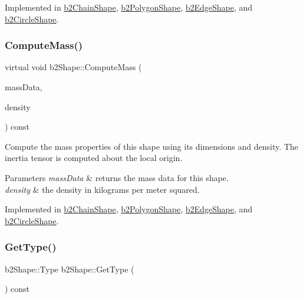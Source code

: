 Implemented in \mbox{\hyperlink{classb2ChainShape_ae1d7470ce8d32e92d27c149ab45f5468}{b2\+Chain\+Shape}}, \mbox{\hyperlink{classb2PolygonShape_ae9bcc185caf4a030003cefc4576e4717}{b2\+Polygon\+Shape}}, \mbox{\hyperlink{classb2EdgeShape_a238139ae1736b457d77443133ff16854}{b2\+Edge\+Shape}}, and \mbox{\hyperlink{classb2CircleShape_af4a4ea78780af7a7ce40bf5d54affe83}{b2\+Circle\+Shape}}.

\mbox{\label{classb2Shape_a61b365526241b47f124789b0309cac69}} 
\subsubsection{\texorpdfstring{Compute\+Mass()}{ComputeMass()}}
{\footnotesize\ttfamily virtual void b2\+Shape\+::\+Compute\+Mass (\begin{DoxyParamCaption}\item[{\mbox{\hyperlink{structb2MassData}{b2\+Mass\+Data}} $\ast$}]{mass\+Data,  }\item[{float32}]{density }\end{DoxyParamCaption}) const\hspace{0.3cm}{\ttfamily [pure virtual]}}

Compute the mass properties of this shape using its dimensions and density. The inertia tensor is computed about the local origin. 
\begin{DoxyParams}{Parameters}
{\em mass\+Data} & returns the mass data for this shape. \\
\hline
{\em density} & the density in kilograms per meter squared. \\
\hline
\end{DoxyParams}


Implemented in \mbox{\hyperlink{classb2ChainShape_aad3671d6eab61f6b26e2f1b6ac50bb98}{b2\+Chain\+Shape}}, \mbox{\hyperlink{classb2PolygonShape_a908db2a51fc79fd49d6fe06be2cd8474}{b2\+Polygon\+Shape}}, \mbox{\hyperlink{classb2EdgeShape_ac738c1e0ab2f4dfbab26e3942efa60af}{b2\+Edge\+Shape}}, and \mbox{\hyperlink{classb2CircleShape_a7dc07891abd015863fbf03076e47eec5}{b2\+Circle\+Shape}}.

\mbox{\label{classb2Shape_a600cceee6186d81bb1b8ab142324bba6}} 
\subsubsection{\texorpdfstring{Get\+Type()}{GetType()}}
{\footnotesize\ttfamily b2\+Shape\+::\+Type b2\+Shape\+::\+Get\+Type (\begin{DoxyParamCaption}{ }\end{DoxyParamCaption}) const\hspace{0.3cm}{\ttfamily [inline]}}

